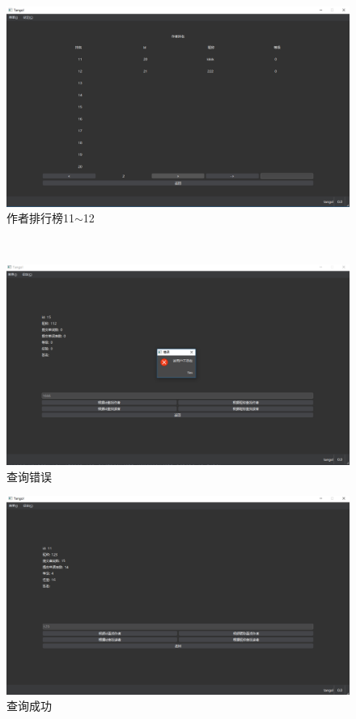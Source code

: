 \documentclass[UTF8]{ctexart}
\begin{document}
\begin{figure}[!ht]
    \centering
    \includegraphics[scale=0.3]{./images/aurk2.png}
    \caption{作者排行榜11$\sim$12}
\end{figure}\\
\begin{figure}[!ht]
    \centering
    \includegraphics[scale=0.3]{./images/serr.png}
    \caption{查询错误}
\end{figure}
\begin{figure}[!ht]
    \centering
    \includegraphics[scale=0.3]{./images/ssuc.png}
    \caption{查询成功}
\end{figure}\\
\end{document}
